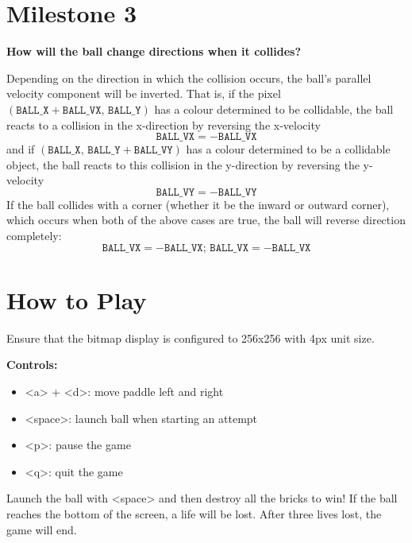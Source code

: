 \documentclass{article}
\begin{document}
\pagebreak


\section*{Milestone 3}

\textbf{How will the ball change directions when it collides?}

Depending on the direction in which the collision occurs, the ball's parallel velocity component will be inverted. That is, if the pixel $(\texttt{BALL\_X}+\texttt{BALL\_VX}, \,\texttt{BALL\_Y})$ has a colour determined to be collidable, the ball reacts to a collision in the x-direction by reversing the x-velocity
\[\texttt{BALL\_VX} = -\texttt{BALL\_VX}\]
and if $(\texttt{BALL\_X},\,\texttt{BALL\_Y}+\texttt{BALL\_VY})$ has a colour determined to be a collidable object, the ball reacts to this collision in the y-direction by reversing the y-velocity
\[\texttt{BALL\_VY} = -\texttt{BALL\_VY}\]
If the ball collides with a corner (whether it be the inward or outward corner), which occurs when both of the above cases are true, the ball will reverse direction completely:
\[\texttt{BALL\_VX} = -\texttt{BALL\_VX}; \,\texttt{BALL\_VX} = -\texttt{BALL\_VX}\]


\pagebreak
{}
\section*{How to Play}

Ensure that the bitmap display is configured to 256x256 with 4px unit size.

\textbf{Controls:}
\begin{itemize}
	\item <a> + <d>: move paddle left and right
	\item <space>: launch ball when starting an attempt
	\item <p>: pause the game
	\item <q>: quit the game
\end{itemize}
Launch the ball with <space> and then destroy all the bricks to win! If the ball reaches the bottom of the screen, a life will be lost. After three lives lost, the game will end.
\end{document}
